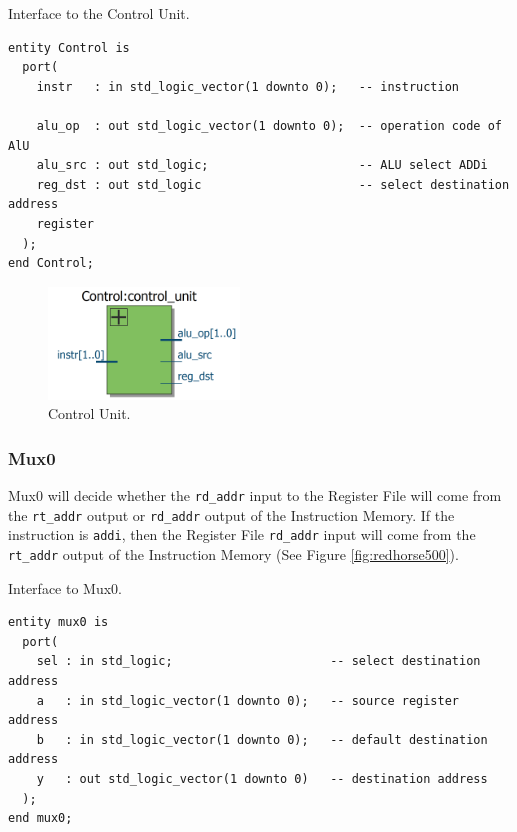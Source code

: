 \documentclass[a4paper, 11pt,oneside]{article}
\begin{document}
\begin{listing}[H]
\caption{Interface to the Control Unit.}
\label{code:control}
\begin{verbatim}
entity Control is
  port(
    instr   : in std_logic_vector(1 downto 0);   -- instruction

    alu_op  : out std_logic_vector(1 downto 0);  -- operation code of AlU
    alu_src : out std_logic;                     -- ALU select ADDi
    reg_dst : out std_logic                      -- select destination address 
    register
  );
end Control;
\end{verbatim}
\end{listing}

\begin{figure}[H]
	\begin{center}
	\includegraphics[width=2in]{control_unit.png}
	\caption{Control Unit.}
	\label{fig:cu} 
	\end{center}
\end{figure}

\subsubsection{Mux0}
Mux0 will decide whether the \texttt{rd_addr} input to the Register 
File will come from the \texttt{rt_addr} output or 
\texttt{rd_addr} output of the Instruction Memory. If the 
instruction is \texttt{addi}, then the Register File 
\texttt{rd_addr} input will come from the \texttt{rt_addr} 
output of the Instruction Memory (See Figure \ref{fig:redhorse500}).

\begin{listing}[H]
\caption{Interface to Mux0.}
\label{code:mux0}
\begin{verbatim}
entity mux0 is
  port(
    sel : in std_logic;                      -- select destination address
    a   : in std_logic_vector(1 downto 0);   -- source register address
    b   : in std_logic_vector(1 downto 0);   -- default destination address
    y   : out std_logic_vector(1 downto 0)   -- destination address
  );
end mux0;
\end{verbatim}
\end{listing}
\end{document}
